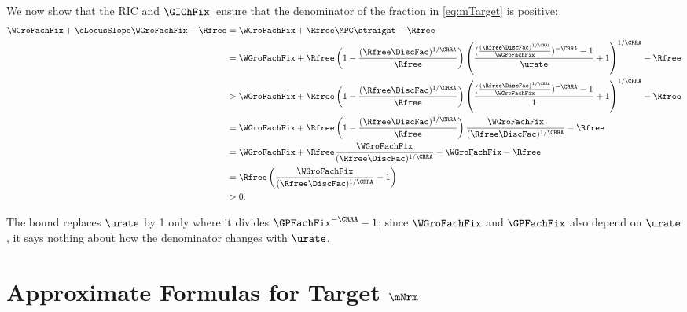 \documentclass{econark}
\begin{document}
We now show that the RIC and $\GIChFix$~ensure that the denominator of the fraction in \eqref{eq:mTarget} is positive: 
\begin{equation}\begin{gathered}\begin{aligned}
\WGroFachFix + \cLocusSlope \WGroFachFix - \Rfree & =  \WGroFachFix + \Rfree \MPC \straight - \Rfree
 \\& =  \WGroFachFix + \Rfree \left(1- \frac{(\Rfree \DiscFac)^{1/\CRRA}}{\Rfree}\right) \left(\frac{(\frac{(\Rfree\DiscFac)^{1/\CRRA}}{\WGroFachFix})^{-\CRRA}-1}{\urate}+1\right)^{1/\CRRA}-\Rfree
 \\& >   \WGroFachFix+\Rfree \left(1-\frac{(\Rfree\DiscFac)^{1/\CRRA}}{\Rfree}\right)
\left(\frac{(\frac{(\Rfree\DiscFac)^{1/\CRRA}}{\WGroFachFix})^{-\CRRA}-1}{1}+1\right)^{1/\CRRA}-\Rfree
 \\& =  \WGroFachFix+\Rfree\left(1-\frac{(\Rfree\DiscFac)^{1/\CRRA}}{\Rfree}\right)\frac{\WGroFachFix}{(\Rfree\DiscFac)^{1/\CRRA}}-\Rfree
 \\& =  \WGroFachFix+\Rfree \frac{\WGroFachFix}{(\Rfree\DiscFac)^{1/\CRRA}}- \WGroFachFix - \Rfree
 \\& =  \Rfree \left(\frac{\WGroFachFix}{(\Rfree\DiscFac)^{1/\CRRA}}-1\right)
 \\& >  0.
\end{aligned}\end{gathered}\end{equation}

The bound replaces $\urate$ by 1 only where it divides $\GPFachFix^{-\CRRA}-1$; since $\WGroFachFix$ and $\GPFachFix$ also depend on $\urate$, it says nothing about how the denominator changes with $\urate$.


\section{Approximate Formulas for Target $\mNrm$}\label{sec:mTargApprox}
\end{document}
